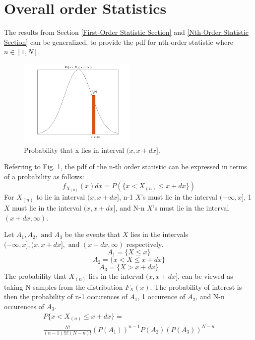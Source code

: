 \documentclass[conference]{IEEEtran}
\begin{document}
\section{Overall order Statistics}
The results from Section \ref{First-Order Statistic Section} and \ref{Nth-Order Statistic Section} can be generalized, to provide the pdf for nth-order statistic where $n\in[1,N]$. 
\begin{figure}[H]
\centerline{\includegraphics[width=0.5\textwidth]{prob_pdf.png}}
\caption{Probability that x lies in interval $(x, x+dx]$.}
\label{Probability of Interval}
\end{figure}
\noindent
Referring to Fig. \ref{Probability of Interval}, the pdf of the n-th order statistic can be expressed in terms of a probability as follows: 
\begin{equation}
f_{X_{(n)}}(x)dx = P(\{x < X_{(n)} \leq x+dx\})
\end{equation}
For $X_{(n)}$ to lie in interval $(x,x+dx]$, n-1 $X$'s must lie in the interval $(-\infty,x]$, 1 $X$ must lie in the interval $(x,x+dx]$, and N-n $X$'s must lie in the interval $(x+dx,\infty)$. 
\par
Let $A_1,A_2,\text{ and }A_3$ be the events that $X$ lies in the intervals $(-\infty,x],(x,x+dx],\text{ and }(x+dx,\infty)$ respectively.
\begin{equation}
A_1 = \{X \leq x\}
\end{equation}
\begin{equation}
A_2 = \{x < X \leq x + dx\}
\end{equation}
\begin{equation}
A_3 = \{X > x + dx\}
\end{equation}
The probability that $X_{(n)}$ lies in the interval $(x,x+dx]$, can be viewed as taking N samples from the distribution $F_X(x)$. The probability of interest is then the probability of n-1 occurences of $A_1$, 1 occurence of $A_2$, and N-n occurences of $A_3$.
\begin{equation}
\begin{gathered}
P\{x < X_{(n)} \leq x + dx\}=\\
\frac{N!}{(n-1)!1!(N-n)!}(P(A_1))^{n-1}P(A_2)(P(A_3))^{N-n}
\end{gathered}
\end{equation}
\end{document}
